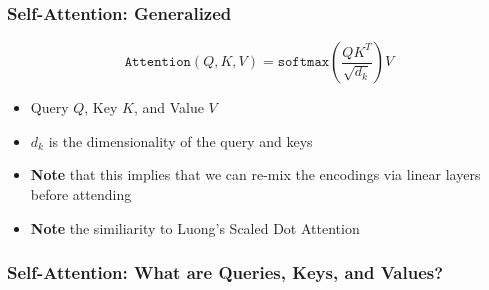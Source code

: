 \documentclass[usenames,dvipsnames]{beamer}
\begin{document}
\begin{frame}
\begin{figure}
    \end{figure}
\end{frame}

%

\begin{frame}
  \frametitle{Self-Attention: Generalized}
  \begin{equation*}
    \texttt{Attention}\left(Q, K, V \right) = \texttt{softmax}\left(\frac{QK^T}{\sqrt{d_k}}\right) V
  \end{equation*}
  \begin{itemize}
    \item Query $Q$, Key $K$, and Value $V$
    \item $d_k$ is the dimensionality of the query and keys
    \item \textbf{Note} that this implies that we can re-mix the encodings via linear layers before attending
    \item \textbf{Note} the similiarity to Luong's Scaled Dot Attention
  \end{itemize}
\end{frame}

\begin{frame}
  \frametitle{Self-Attention: What are Queries, Keys, and Values?}
\end{frame}
\end{document}
